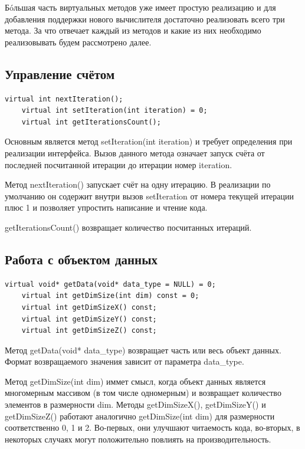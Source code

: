 \documentclass[a4paper,12pt]{extarticle}
\begin{document}
Б\'oльшая часть виртуальных методов уже имеет простую реализацию и для добавления поддержки нового вычислителя достаточно реализовать всего три метода. За что отвечает каждый из методов и какие из них необходимо реализовывать будем рассмотрено далее.

\subsection{Управление счётом}

\begin{lstlisting}[firstnumber=21,title=~~~~Запуск и остановка процесса моделирования происходит с использованием следующих функций:]
    virtual int nextIteration();
    virtual int setIteration(int iteration) = 0;
    virtual int getIterationsCount();
\end{lstlisting}

Основным является метод \textsf{setIteration(int iteration)} и требует определения при реализации интерфейса. Вызов данного метода означает запуск счёта от последней посчитанной итерации до итерации номер \textsf{iteration}.

Метод \textsf{nextIteration()} запускает счёт на одну итерацию. В реализации по умолчанию он содержит внутри вызов \textsf{setIteration} от номера текущей итерации плюс 1 и позволяет упростить написание и чтение кода.

\textsf{getIterationsCount()} возвращает количество посчитанных итераций.



\subsection{Работа с объектом данных}

\begin{lstlisting}[firstnumber=25,title=Получение объекта данных происходит с использованием следующих функций:]
    virtual void* getData(void* data_type = NULL) = 0;
    virtual int getDimSize(int dim) const = 0;
    virtual int getDimSizeX() const;
    virtual int getDimSizeY() const;
    virtual int getDimSizeZ() const;
\end{lstlisting}

Метод \textsf{getData(void* data\_type)} возвращает часть или весь объект данных. Формат возвращаемого значения зависит от параметра \textsf{data\_type}.

Метод \textsf{getDimSize(int dim)} иммет смысл, когда объект данных является многомерным массивом (в том числе одномерным) и возвращает количество элементов в размерности \textsf{dim}. Методы \textsf{getDimSizeX()}, \textsf{getDimSizeY()} и \textsf{getDimSizeZ()} работают аналогично \textsf{getDimSize(int dim)} для размерности соответственно 0, 1 и 2. Во-первых, они улучшают читаемость кода, во-вторых, в некоторых случаях могут положительно повлиять на производительность.
\end{document}
